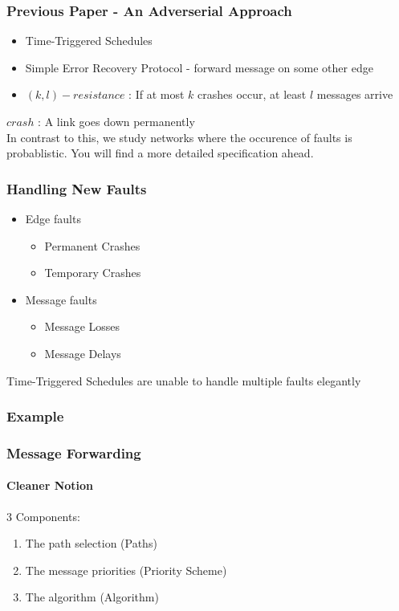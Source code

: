 \documentclass{beamer}
\begin{document}
\begin{frame}
\frametitle{Previous Paper - An Adverserial Approach}
	\begin{itemize}
	\item Time-Triggered Schedules
	\item Simple Error Recovery Protocol - forward message on some other edge
	\item $(k,l)-resistance$ : If at most $k$ crashes occur, at least $l$ messages arrive\\[3ex]
	\end{itemize}
	\hspace*{20pt}$ crash $ : A link goes down permanently\\[3ex]
	In contrast to this, we study networks where the occurence of faults is probablistic. You will find a more detailed specification ahead.
\end{frame}

\begin{frame}
\frametitle{Handling New Faults}
	\begin{itemize}
	\item Edge faults
	\begin{itemize}
		\item Permanent Crashes 
		\item Temporary Crashes
	\end{itemize}
	\item Message faults
	\begin{itemize}
		\item Message Losses
		\item Message Delays\\[2ex]
	\end{itemize}
	\end{itemize}
	\pause
	\begin{center}
	\color{red}
	Time-Triggered Schedules are unable to handle multiple faults elegantly
	\end{center}
\end{frame}


\begin{frame}
\frametitle{Example}



\end{frame}


\begin{frame}
\frametitle{Message Forwarding}
	\framesubtitle{Cleaner Notion}
	3 Components:\\
	\begin{enumerate}
	\item The path selection (Paths)
	\item The message priorities (Priority Scheme)
	\item The algorithm (Algorithm)
	\end{enumerate}
\end{frame}
\end{document}
